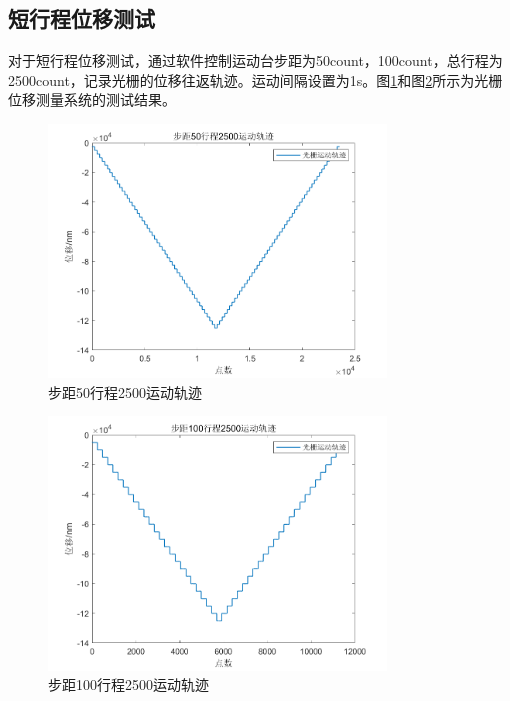 \documentclass[type=master,oneside]{fduthesis}
\begin{document}
\subsection{短行程位移测试}
对于短行程位移测试，通过软件控制运动台步距为50count，100count，总行程为2500count，记录光栅的位移往返轨迹。运动间隔设置为1s。图\ref{fig:步距50行程2500运动轨迹}和图\ref{fig:步距100行程2500运动轨迹}所示为光栅位移测量系统的测试结果。

\begin{figure}[H]
  \centering
  \includegraphics[width=0.8\textwidth]{4-fig//步距50行程2500运动轨迹.png}
  \caption{步距50行程2500运动轨迹}
  \label{fig:步距50行程2500运动轨迹}
\end{figure}

\begin{figure}[H]
  \centering
  \includegraphics[width=0.8\textwidth]{4-fig//步距100行程2500运动轨迹.png}
  \caption{步距100行程2500运动轨迹}
  \label{fig:步距100行程2500运动轨迹}
\end{figure}
\end{document}
